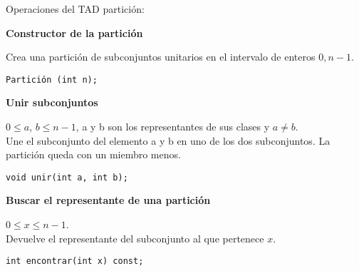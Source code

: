 Operaciones del TAD partición:

\textbf{Constructor de la partición}

 Crea una partición de subconjuntos unitarios en el intervalo de enteros \(0, n-1\).
\begin{center}
  \verb|Partición (int n);|
\end{center}

\textbf{Unir subconjuntos}

 \(0 \leq a\), \(b \leq n-1\), a y b son los representantes de sus clases y \(a \neq b\).\\
Une el subconjunto del elemento a y b en uno de los dos subconjuntos. La partición queda con un miembro menos.
\begin{center}
  \verb|void unir(int a, int b);|
\end{center}

\textbf{Buscar el representante de una partición}

 \(0 \leq x \leq n-1\).\\
Devuelve el representante del subconjunto al que pertenece \(x\).
\begin{center}
  \verb|int encontrar(int x) const;|
\end{center}

